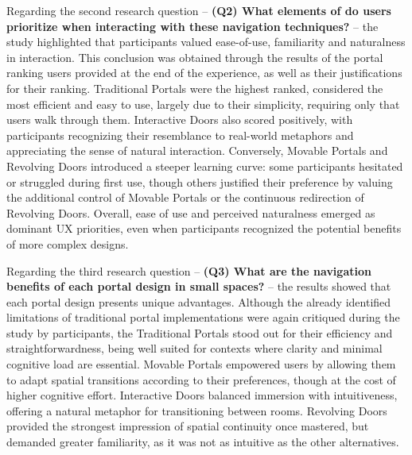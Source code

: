 Regarding the second research question -- \textbf{(Q2) What elements of  do users prioritize when interacting with these navigation techniques?} -- 
the study highlighted that participants valued ease-of-use, familiarity and naturalness in interaction.
This conclusion was obtained through the results of the portal ranking users provided at the end of the experience, as well as their justifications 
for their ranking.
Traditional Portals were the highest ranked, considered the most efficient and easy to use, largely due to their simplicity, requiring only that users walk through them. 
Interactive Doors also scored positively, with participants recognizing their resemblance to real-world metaphors and appreciating the sense of natural interaction. 
Conversely, Movable Portals and Revolving Doors introduced a steeper learning curve: some participants hesitated or struggled during first use, 
though others justified their preference by valuing the additional control of Movable Portals or the continuous redirection of Revolving Doors. 
Overall, ease of use and perceived naturalness emerged as dominant \gls{UX} priorities, 
even when participants recognized the potential benefits of more complex designs.

Regarding the third research question -- \textbf{(Q3) What are the navigation benefits of each portal design in small spaces?} -- 
the results showed that each portal design presents unique advantages. 
Although the already identified limitations of traditional portal implementations were again critiqued during the study by participants, 
the Traditional Portals stood out for their efficiency and straightforwardness, being well suited for contexts where clarity and 
minimal cognitive load are essential. 
Movable Portals empowered users by allowing them to adapt spatial transitions according to their preferences,
though at the cost of higher cognitive effort. 
Interactive Doors balanced immersion with intuitiveness, offering a natural metaphor for transitioning between rooms. 
Revolving Doors provided the strongest impression of spatial continuity once mastered, but demanded greater familiarity, as it was not 
as intuitive as the other alternatives. 

